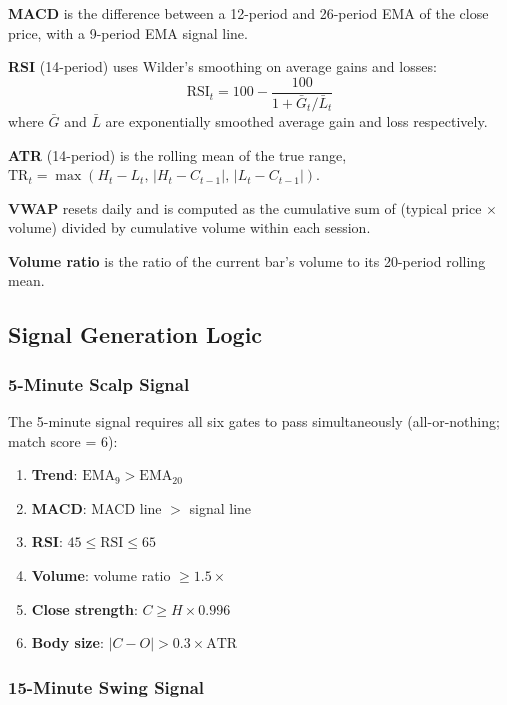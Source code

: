 \documentclass[conference]{IEEEtran}
\begin{document}
\textbf{MACD} is the difference between a 12-period and
26-period EMA of the close price, with a 9-period EMA
signal line.

\textbf{RSI} (14-period) uses Wilder's smoothing on
average gains and losses:
\begin{equation}
  \mathrm{RSI}_t = 100 - \frac{100}{1 + \bar{G}_t / \bar{L}_t}
  \label{eq:rsi}
\end{equation}
where $\bar{G}$ and $\bar{L}$ are exponentially smoothed
average gain and loss respectively.

\textbf{ATR} (14-period) is the rolling mean of the true
range, $\mathrm{TR}_t = \max(H_t - L_t,\, |H_t - C_{t-1}|,\,
|L_t - C_{t-1}|)$.

\textbf{VWAP} resets daily and is computed as the
cumulative sum of (typical price $\times$ volume) divided
by cumulative volume within each session.

\textbf{Volume ratio} is the ratio of the current bar's
volume to its 20-period rolling mean.

\subsection{Signal Generation Logic}

\subsubsection{5-Minute Scalp Signal}

The 5-minute signal requires all six gates to pass
simultaneously (all-or-nothing; match score = 6):
\begin{enumerate}
  \item \textbf{Trend}: $\mathrm{EMA}_9 > \mathrm{EMA}_{20}$
  \item \textbf{MACD}: MACD line $>$ signal line
  \item \textbf{RSI}: $45 \leq \mathrm{RSI} \leq 65$
  \item \textbf{Volume}: volume ratio $\geq 1.5\times$
  \item \textbf{Close strength}: $C \geq H \times 0.996$
  \item \textbf{Body size}: $|C - O| > 0.3 \times \mathrm{ATR}$
\end{enumerate}

\subsubsection{15-Minute Swing Signal}
\end{document}
